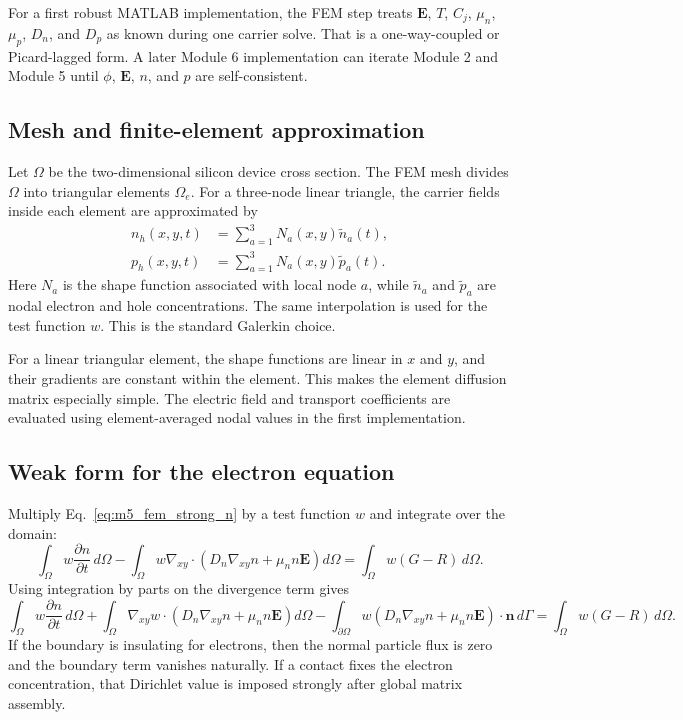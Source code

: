 \documentclass[11pt]{article}
\begin{document}
For a first robust MATLAB implementation, the FEM step treats \(\mathbf{E}\), \(T\), \(C_j\), \(\mu_n\), \(\mu_p\), \(D_n\), and \(D_p\) as known during one carrier solve. That is a one-way-coupled or Picard-lagged form. A later Module 6 implementation can iterate Module 2 and Module 5 until \(\phi\), \(\mathbf{E}\), \(n\), and \(p\) are self-consistent.

\subsection{Mesh and finite-element approximation}

Let \(\Omega\) be the two-dimensional silicon device cross section. The FEM mesh divides \(\Omega\) into triangular elements \(\Omega_e\). For a three-node linear triangle, the carrier fields inside each element are approximated by
\begin{align}
    n_h(x,y,t) &= \sum_{a=1}^{3} N_a(x,y)\tilde{n}_a(t), \\
    p_h(x,y,t) &= \sum_{a=1}^{3} N_a(x,y)\tilde{p}_a(t).
\end{align}
Here \(N_a\) is the shape function associated with local node \(a\), while \(\tilde{n}_a\) and \(\tilde{p}_a\) are nodal electron and hole concentrations. The same interpolation is used for the test function \(w\). This is the standard Galerkin choice.

For a linear triangular element, the shape functions are linear in \(x\) and \(y\), and their gradients are constant within the element. This makes the element diffusion matrix especially simple. The electric field and transport coefficients are evaluated using element-averaged nodal values in the first implementation.

\subsection{Weak form for the electron equation}

Multiply Eq.~\eqref{eq:m5_fem_strong_n} by a test function \(w\) and integrate over the domain:
\begin{equation}
    \int_\Omega w\frac{\partial n}{\partial t}\,d\Omega
    -\int_\Omega w\nabla_{xy}\cdot\left(D_n\nabla_{xy}n+\mu_n n\mathbf{E}\right)d\Omega
    =\int_\Omega w(G-R)\,d\Omega.
\end{equation}
Using integration by parts on the divergence term gives
\begin{equation}
    \int_\Omega w\frac{\partial n}{\partial t}\,d\Omega
    +\int_\Omega \nabla_{xy}w\cdot\left(D_n\nabla_{xy}n+\mu_n n\mathbf{E}\right)d\Omega
    -\int_{\partial\Omega}w\left(D_n\nabla_{xy}n+\mu_n n\mathbf{E}\right)\cdot\mathbf{n}\,d\Gamma
    =\int_\Omega w(G-R)\,d\Omega.
    \label{eq:m5_weak_n}
\end{equation}
If the boundary is insulating for electrons, then the normal particle flux is zero and the boundary term vanishes naturally. If a contact fixes the electron concentration, that Dirichlet value is imposed strongly after global matrix assembly.
\end{document}
